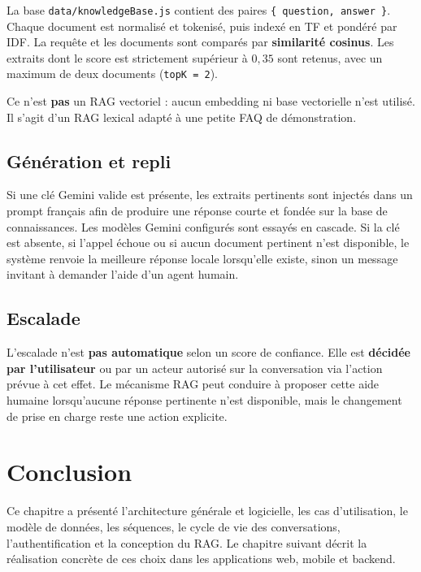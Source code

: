 La base \texttt{data/knowledgeBase.js} contient des paires \texttt{\{ question, answer \}}. Chaque document est normalisé et tokenisé, puis indexé en TF et pondéré par IDF. La requête et les documents sont comparés par \textbf{similarité cosinus}. Les extraits dont le score est strictement supérieur à $0{,}35$ sont retenus, avec un maximum de deux documents (\texttt{topK = 2}).

Ce n'est \textbf{pas} un RAG vectoriel : aucun embedding ni base vectorielle n'est utilisé. Il s'agit d'un RAG \og lexical \fg{} adapté à une petite FAQ de démonstration.

\subsection{Génération et repli}

Si une clé Gemini valide est présente, les extraits pertinents sont injectés dans un prompt français afin de produire une réponse courte et fondée sur la base de connaissances. Les modèles Gemini configurés sont essayés en cascade. Si la clé est absente, si l'appel échoue ou si aucun document pertinent n'est disponible, le système renvoie la meilleure réponse locale lorsqu'elle existe, sinon un message invitant à demander l'aide d'un agent humain.

\subsection{Escalade}

L'escalade n'est \textbf{pas automatique} selon un score de confiance. Elle est \textbf{décidée par l'utilisateur} ou par un acteur autorisé sur la conversation via l'action prévue à cet effet. Le mécanisme RAG peut conduire à proposer cette aide humaine lorsqu'aucune réponse pertinente n'est disponible, mais le changement de prise en charge reste une action explicite.

\section{Conclusion}

Ce chapitre a présenté l'architecture générale et logicielle, les cas d'utilisation, le modèle de données, les séquences, le cycle de vie des conversations, l'authentification et la conception du RAG. Le chapitre suivant décrit la réalisation concrète de ces choix dans les applications web, mobile et backend.

